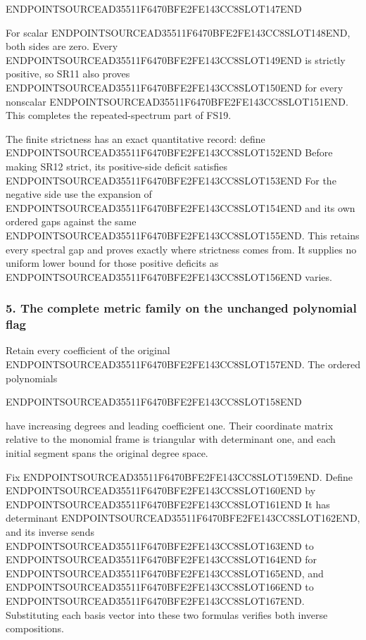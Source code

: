 ENDPOINTSOURCEAD35511F6470BFE2FE143CC8SLOT147END

For scalar ENDPOINTSOURCEAD35511F6470BFE2FE143CC8SLOT148END, both sides are zero. Every ENDPOINTSOURCEAD35511F6470BFE2FE143CC8SLOT149END is strictly positive, so SR11 also proves ENDPOINTSOURCEAD35511F6470BFE2FE143CC8SLOT150END for every nonscalar ENDPOINTSOURCEAD35511F6470BFE2FE143CC8SLOT151END. This completes the repeated-spectrum part of FS19.

The finite strictness has an exact quantitative record: define ENDPOINTSOURCEAD35511F6470BFE2FE143CC8SLOT152END Before making SR12 strict, its positive-side deficit satisfies ENDPOINTSOURCEAD35511F6470BFE2FE143CC8SLOT153END For the negative side use the expansion of ENDPOINTSOURCEAD35511F6470BFE2FE143CC8SLOT154END and its own ordered gaps against the same ENDPOINTSOURCEAD35511F6470BFE2FE143CC8SLOT155END. This retains every spectral gap and proves exactly where strictness comes from. It supplies no uniform lower bound for those positive deficits as ENDPOINTSOURCEAD35511F6470BFE2FE143CC8SLOT156END varies.

\subsubsection{5. The complete metric family on the unchanged polynomial flag}\label{endpoint-four_window_sharpness_review--the-complete-metric-family-on-the-unchanged-polynomial-flag}

Retain every coefficient of the original ENDPOINTSOURCEAD35511F6470BFE2FE143CC8SLOT157END. The ordered polynomials

ENDPOINTSOURCEAD35511F6470BFE2FE143CC8SLOT158END

have increasing degrees and leading coefficient one. Their coordinate matrix relative to the monomial frame is triangular with determinant one, and each initial segment spans the original degree space.

Fix ENDPOINTSOURCEAD35511F6470BFE2FE143CC8SLOT159END. Define ENDPOINTSOURCEAD35511F6470BFE2FE143CC8SLOT160END by ENDPOINTSOURCEAD35511F6470BFE2FE143CC8SLOT161END It has determinant ENDPOINTSOURCEAD35511F6470BFE2FE143CC8SLOT162END, and its inverse sends ENDPOINTSOURCEAD35511F6470BFE2FE143CC8SLOT163END to ENDPOINTSOURCEAD35511F6470BFE2FE143CC8SLOT164END for ENDPOINTSOURCEAD35511F6470BFE2FE143CC8SLOT165END, and ENDPOINTSOURCEAD35511F6470BFE2FE143CC8SLOT166END to ENDPOINTSOURCEAD35511F6470BFE2FE143CC8SLOT167END. Substituting each basis vector into these two formulas verifies both inverse compositions.

